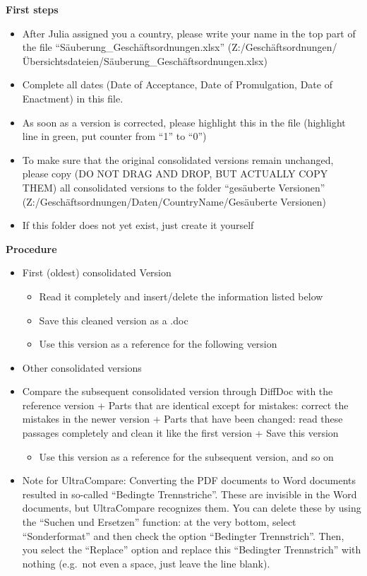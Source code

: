 \documentclass[10pt,]{article}
\providecommand{\tightlist}{%
  \setlength{\itemsep}{0pt}\setlength{\parskip}{0pt}}
\begin{document}
\textbf{First steps}

\begin{itemize}
\tightlist
\item
  After Julia assigned you a country, please write your name in the top
  part of the file ``Säuberung\_Geschäftsordnungen.xlsx''
  (Z:/Geschäftsordnungen/Übersichtsdateien/Säuberung\_Geschäftsordnungen.xlsx)
\item
  Complete all dates (Date of Acceptance, Date of Promulgation, Date of
  Enactment) in this file.
\item
  As soon as a version is corrected, please highlight this in the file
  (highlight line in green, put counter from ``1'' to ``0'')
\item
  To make sure that the original consolidated versions remain unchanged,
  please copy (DO NOT DRAG AND DROP, BUT ACTUALLY COPY THEM) all
  consolidated versions to the folder ``gesäuberte Versionen''
  (Z:/Geschäftsordnungen/Daten/CountryName/Gesäuberte Versionen)
\item
  If this folder does not yet exist, just create it yourself
\end{itemize}

\textbf{Procedure}

\begin{itemize}
\tightlist
\item
  First (oldest) consolidated Version

  \begin{itemize}
  \tightlist
  \item
    Read it completely and insert/delete the information listed below
  \item
    Save this cleaned version as a .doc
  \item
    Use this version as a reference for the following version
  \end{itemize}
\item
  Other consolidated versions
\item
  Compare the subsequent consolidated version through DiffDoc with the
  reference version + Parts that are identical except for mistakes:
  correct the mistakes in the newer version + Parts that have been
  changed: read these passages completely and clean it like the first
  version + Save this version

  \begin{itemize}
  \tightlist
  \item
    Use this version as a reference for the subsequent version, and so
    on
  \end{itemize}
\item
  Note for UltraCompare: Converting the PDF documents to Word documents
  resulted in so-called ``Bedingte Trennstriche''. These are invisible
  in the Word documents, but UltraCompare recognizes them. You can
  delete these by using the ``Suchen und Ersetzen'' function: at the
  very bottom, select ``Sonderformat'' and then check the option
  ``Bedingter Trennstrich''. Then, you select the ``Replace'' option and
  replace this ``Bedingter Trennstrich'' with nothing (e.g.~not even a
  space, just leave the line blank).
\end{itemize}
\end{document}
